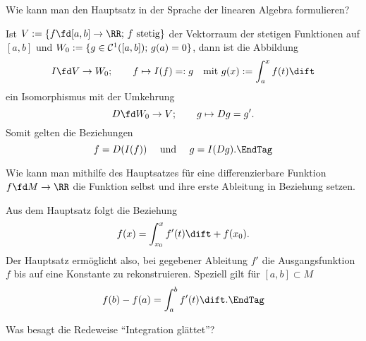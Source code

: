 \begin{frage}
Wie kann man den Hauptsatz in der Sprache der linearen Algebra formulieren?
\end{frage}

\begin{antwort}
Ist $V:= \{ f\fd [a,b]\to\RR;\,\text{$f$ stetig} \}$ der Vektorraum der 
stetigen Funktionen auf $[a,b]$ und 
$W_0:= \{ g\in {\cal C}^1([a,b]);\,  g(a)=0 \}$, dann ist die Abbildung 
\[
I \fd V\to W_0; \qquad 
f \mapsto I(f) = :g  \quad\text{mit } g(x):= \int_a^x f(t)\dift 
\]
ein Isomorphismus mit der Umkehrung 
\begin{equation}
D\fd W_0 \to V; \qquad g \mapsto Dg=g'.
\end{equation}
Somit gelten die Beziehungen 
\begin{equation}
f = D(I(f))\quad\text{ und }\quad g = I(Dg).\EndTag
\end{equation} 
\end{antwort}

\begin{frage}
Wie kann man mithilfe des Hauptsatzes für eine 
differenzierbare Funktion 
$f\fd M\to \RR$ die Funktion selbst und ihre erste Ableitung in Beziehung 
setzen.
\end{frage}

\begin{antwort}
Aus dem Hauptsatz folgt die Beziehung 
\[
f(x)=\int_{x_0}^x f'(t)\dift + f(x_0).
\]
Der Hauptsatz ermöglicht also, bei gegebener Ableitung $f'$ die 
Ausgangsfunktion $f$ bis auf eine Konstante zu rekonstruieren. 
Speziell gilt für $[a,b]\subset M$
\begin{equation}
f(b)-f(a)=\int_a^b f'(t) \dift.
\EndTag
\end{equation}
\end{antwort}

\begin{frage}
Was besagt die Redeweise "`Integration glättet"'?
\end{frage}

